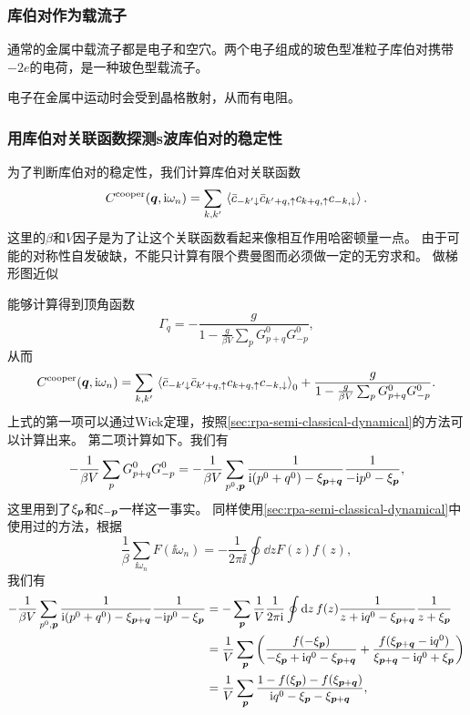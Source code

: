 \subsubsection{库伯对作为载流子}

通常的金属中载流子都是电子和空穴。两个电子组成的玻色型准粒子库伯对携带$-2e$的电荷，是一种玻色型载流子。

电子在金属中运动时会受到晶格散射，从而有电阻。

\subsubsection{用库伯对关联函数探测s波库伯对的稳定性}

为了判断库伯对的稳定性，我们计算库伯对关联函数
\begin{equation}
    C^\text{cooper}(\vb*{q}, \mathrm{i} \omega_n) = \sum_{k, k'} \expval*{\bar{c}_{-k' \downarrow} \bar{c}_{k'+q, \uparrow} c_{k+q, \uparrow} c_{-k, \downarrow}}.
\end{equation}
这里的$\beta$和$V$因子是为了让这个关联函数看起来像相互作用哈密顿量一点。
由于可能的对称性自发破缺，不能只计算有限个费曼图而必须做一定的无穷求和。
做梯形图近似

能够计算得到顶角函数
\begin{equation}
    \Gamma_q = - \frac{g}{1 - \frac{g}{\beta V} \sum_{p} G^0_{p+q} G^0_{-p}} ,
    \label{eq:bcs-four-e-vertex-eff}
\end{equation}
从而
\begin{equation}
    C^\text{cooper}(\vb*{q}, \mathrm{i} \omega_n) = \sum_{k, k'} \expval*{\bar{c}_{-k' \downarrow} \bar{c}_{k'+q, \uparrow} c_{k+q, \uparrow} c_{-k, \downarrow}}_0 + \frac{g}{1 - \frac{g}{\beta V} \sum_{p} G^0_{p+q} G^0_{-p}}.
    \label{eq:bcs-cooper-pair-correlation}
\end{equation}
上式的第一项可以通过Wick定理，按照\autoref{sec:rpa-semi-classical-dynamical}的方法可以计算出来。
第二项计算如下。我们有
\[
    - \frac{1}{\beta V} \sum_p G^0_{p+q} G^0_{-p} = - \frac{1}{\beta V} \sum_{p^0, \vb*{p}} \frac{1}{\mathrm{i} (p^0 + q^0) - \xi_{\vb*{p} + \vb*{q}}} \frac{1}{- \mathrm{i} p^0 - \xi_{\vb*{p}}},
\]
这里用到了$\xi_{\vb*{p}}$和$\xi_{-\vb*{p}}$一样这一事实。
同样使用\autoref{sec:rpa-semi-classical-dynamical}中使用过的方法，根据
\[
    \frac{1}{\beta} \sum_{\ii \omega_n} F(\ii \omega_n) = - \frac{1}{2\pi \ii} \oint \dd{z} F(z) f(z),
\]
我们有
\[
    \begin{aligned}
        - \frac{1}{\beta V} \sum_{p^0, \vb*{p}} \frac{1}{\mathrm{i} (p^0 + q^0) - \xi_{\vb*{p} + \vb*{q}}} \frac{1}{- \mathrm{i} p^0 - \xi_{\vb*{p}}} &= - \sum_{\vb*{p}} \frac{1}{V} \frac{1}{2\pi \mathrm{i}} \oint \dd{z} f(z) \frac{1}{z + \mathrm{i} q^0 - \xi_{\vb*{p}+\vb*{q}}} \frac{1}{z+\xi_{\vb*{p}}} \\
        &= \frac{1}{V} \sum_{\vb*{p}} \left( \frac{f(-\xi_{\vb*{p}})}{- \xi_{\vb*{p}} + \mathrm{i} q^0 - \xi_{\vb*{p}+\vb*{q}}} + \frac{f(\xi_{\vb*{p}+\vb*{q}} - \mathrm{i} q^0)}{\xi_{\vb*{p}+\vb*{q}} - \mathrm{i} q^0 + \xi_{\vb*{p}}} \right) \\
        &= \frac{1}{V} \sum_{\vb*{p}} \frac{1 - f(\xi_{\vb*{p}}) - f(\xi_{\vb*{p}+\vb*{q}})}{\mathrm{i} q^0 - \xi_{\vb*{p}} - \xi_{\vb*{p} + \vb*{q}}},
    \end{aligned}
\]
